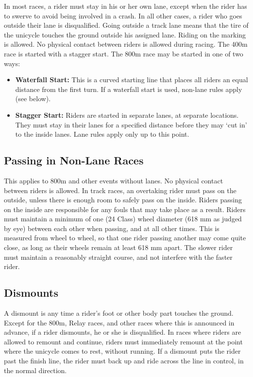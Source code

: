 In most races, a rider must stay in his or her own lane, except when the rider has to swerve to avoid being involved in a crash.
In all other cases, a rider who goes outside their lane is disqualified.
Going outside a track lane means that the tire of the unicycle touches the ground outside his assigned lane.
Riding on the marking is allowed.
No physical contact between riders is allowed during racing.
The 400m race is started with a stagger start.
The 800m race may be started in one of two ways:
\begin{itemize}
\item \textbf{Waterfall Start:} This is a curved starting line that places all riders an equal distance from the first turn.
If a waterfall start is used, non-lane rules apply (see below).
\item \textbf{Stagger Start:} Riders are started in separate lanes, at separate locations.
They must stay in their lanes for a specified distance before they may `cut in' to the inside lanes.
Lane rules apply only up to this point.
\end{itemize}

\subsection{Passing in Non-Lane Races \label{subsec:track-field_lane-use_non-lane-races}}

This applies to 800m and other events without lanes.
No physical contact between riders is allowed.
In track races, an overtaking rider must pass on the outside, unless there is enough room to safely pass on the inside.
Riders passing on the inside are responsible for any fouls that may take place as a result.
Riders must maintain a minimum of one (24 Class) wheel diameter (618 mm as judged by eye) between each other when passing, and at all other times.
This is measured from wheel to wheel, so that one rider passing another may come quite close, as long as their wheels remain at least 618 mm apart.
The slower rider must maintain a reasonably straight course, and not interfere with the faster rider.


\subsection{Dismounts}

A dismount is any time a rider's foot or other body part touches the ground.
Except for the 800m, Relay races, and other races where this is announced in advance, if a rider dismounts, he or she is disqualified.
In races where riders are allowed to remount and continue, riders must immediately remount at the point where the unicycle comes to rest, without running.
If a dismount puts the rider past the finish line, the rider must back up and ride across the line in control, in the normal direction.


